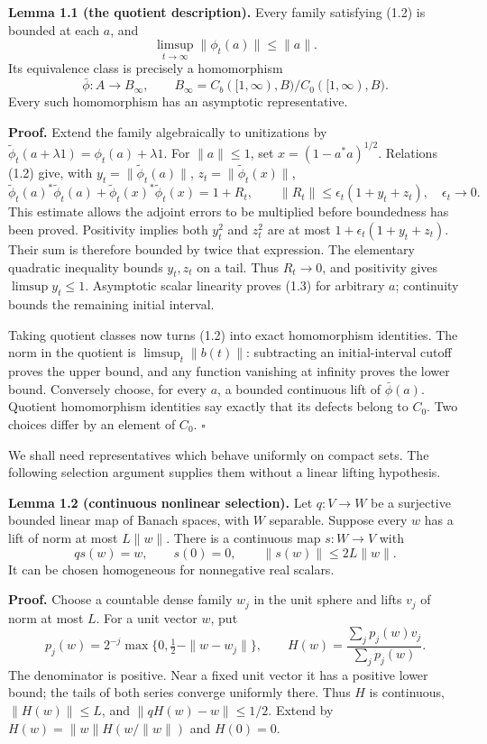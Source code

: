 \documentclass[
  11pt,
]{article}
\begin{document}
\textbf{Lemma 1.1 (the quotient description).} Every family satisfying
(1.2) is bounded at each \(a\), and \[
\limsup_{t\to\infty}\|\phi_t(a)\|\leq\|a\|.
\tag{1.3}
\] Its equivalence class is precisely a homomorphism \[
\bar\phi:A\longrightarrow B_\infty,
\qquad
B_\infty=C_b([1,\infty),B)/C_0([1,\infty),B).
\tag{1.4}
\] Every such homomorphism has an asymptotic representative.

\textbf{Proof.} Extend the family algebraically to unitizations by
\(\widetilde\phi_t(a+\lambda1)=\phi_t(a)+\lambda1\). For \(\|a\|\leq1\),
set \(x=(1-a^*a)^{1/2}\). Relations (1.2) give, with
\(y_t=\|\widetilde\phi_t(a)\|\), \(z_t=\|\widetilde\phi_t(x)\|\), \[
\widetilde\phi_t(a)^*\widetilde\phi_t(a)
+\widetilde\phi_t(x)^*\widetilde\phi_t(x)
=1+R_t,
\qquad
\|R_t\|\leq\epsilon_t(1+y_t+z_t),\quad\epsilon_t\to0.
\] This estimate allows the adjoint errors to be multiplied before
boundedness has been proved. Positivity implies both \(y_t^2\) and
\(z_t^2\) are at most \(1+\epsilon_t(1+y_t+z_t)\). Their sum is
therefore bounded by twice that expression. The elementary quadratic
inequality bounds \(y_t,z_t\) on a tail. Thus \(R_t\to0\), and
positivity gives \(\limsup y_t\leq1\). Asymptotic scalar linearity
proves (1.3) for arbitrary \(a\); continuity bounds the remaining
initial interval.

Taking quotient classes now turns (1.2) into exact homomorphism
identities. The norm in the quotient is \(\limsup_t\|b(t)\|\):
subtracting an initial-interval cutoff proves the upper bound, and any
function vanishing at infinity proves the lower bound. Conversely
choose, for every \(a\), a bounded continuous lift of \(\bar\phi(a)\).
Quotient homomorphism identities say exactly that its defects belong to
\(C_0\). Two choices differ by an element of \(C_0\). \(\square\)

We shall need representatives which behave uniformly on compact sets.
The following selection argument supplies them without a linear lifting
hypothesis.

\textbf{Lemma 1.2 (continuous nonlinear selection).} Let \(q:V\to W\) be
a surjective bounded linear map of Banach spaces, with \(W\) separable.
Suppose every \(w\) has a lift of norm at most \(L\|w\|\). There is a
continuous map \(s:W\to V\) with \[
qs(w)=w,\qquad s(0)=0,\qquad
\|s(w)\|\leq 2L\|w\|.
\tag{1.5}
\] It can be chosen homogeneous for nonnegative real scalars.

\textbf{Proof.} Choose a countable dense family \(w_j\) in the unit
sphere and lifts \(v_j\) of norm at most \(L\). For a unit vector \(w\),
put \[
p_j(w)=2^{-j}\max\{0,\tfrac12-\|w-w_j\|\},\qquad
H(w)=\frac{\sum_jp_j(w)v_j}{\sum_jp_j(w)}.
\tag{1.6}
\] The denominator is positive. Near a fixed unit vector it has a
positive lower bound; the tails of both series converge uniformly there.
Thus \(H\) is continuous, \(\|H(w)\|\leq L\), and
\(\|qH(w)-w\|\leq1/2\). Extend by \(H(w)=\|w\|H(w/\|w\|)\) and
\(H(0)=0\).
\end{document}

